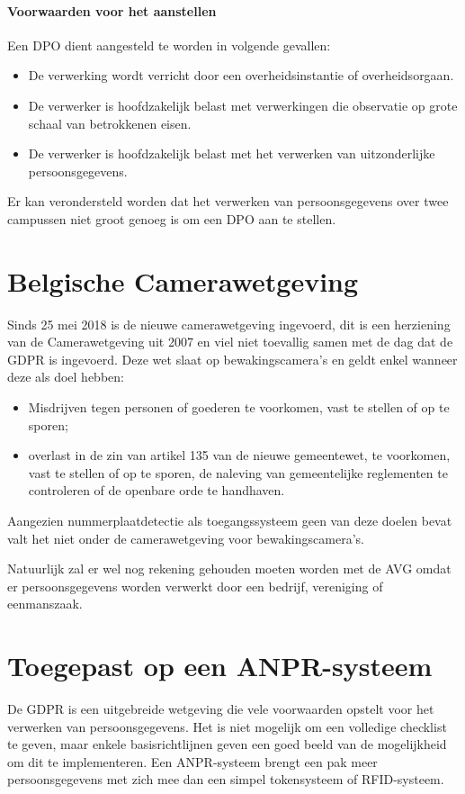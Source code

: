 \paragraph{Voorwaarden voor het aanstellen}
Een DPO dient aangesteld te worden in volgende gevallen:
\begin{itemize}
	\item De verwerking wordt verricht door een overheidsinstantie of overheidsorgaan.
	\item De verwerker is hoofdzakelijk belast met verwerkingen die observatie op grote schaal van betrokkenen eisen.
	\item De verwerker is hoofdzakelijk belast met het verwerken van uitzonderlijke persoonsgegevens.
\end{itemize}

Er kan verondersteld worden dat het verwerken van persoonsgegevens over twee campussen niet groot genoeg is om een DPO aan te stellen.

\section{Belgische Camerawetgeving}
Sinds 25 mei 2018 is de nieuwe camerawetgeving ingevoerd, dit is een herziening van de Camerawetgeving uit 2007 en viel niet toevallig samen met de dag dat de GDPR is ingevoerd. Deze wet slaat op bewakingscamera's en geldt enkel wanneer deze als doel hebben:
\begin{itemize}
	\item Misdrijven tegen personen of goederen te voorkomen, vast te stellen of op te sporen;
	\item overlast in de zin van artikel 135 van de nieuwe gemeentewet, te voorkomen, vast te stellen of op te sporen, de naleving van gemeentelijke reglementen te controleren of de openbare orde te handhaven.
\end{itemize}
Aangezien nummerplaatdetectie als toegangssysteem geen van deze doelen bevat valt het niet onder de camerawetgeving voor bewakingscamera's. \autocite{staatsblad2007wet}

Natuurlijk zal er wel nog rekening gehouden moeten worden met de AVG omdat er persoonsgegevens worden verwerkt door een bedrijf, vereniging of eenmanszaak. \autocite{gba2019videoparlofoon}

\section{Toegepast op een ANPR-systeem}
De GDPR is een uitgebreide wetgeving die vele voorwaarden opstelt voor het verwerken van persoonsgegevens. Het is niet mogelijk om een volledige checklist te geven, maar enkele basisrichtlijnen geven een goed beeld van de mogelijkheid om dit te implementeren. Een ANPR-systeem brengt een pak meer persoonsgegevens met zich mee dan een simpel tokensysteem of RFID-systeem.

